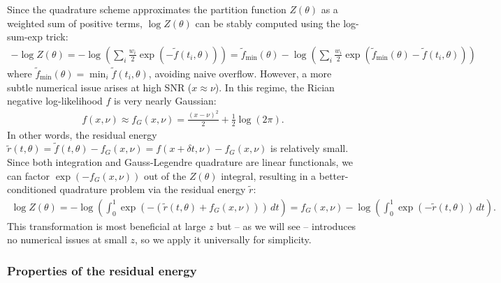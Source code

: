 \documentclass{article}
\begin{document}
Since the quadrature scheme approximates the partition function $Z(\theta)$ as a weighted sum of positive terms, $\log Z(\theta)$ can be stably computed using the log-sum-exp trick:
%
\begin{align}
  -\log Z(\theta)
  = -\log\left(\sum_i \frac{w_i}{2} \exp(-\tilde{f}(t_i, \theta))\right)
  = \tilde{f}_{\min}(\theta) - \log\left(\sum_i \frac{w_i}{2} \exp(\tilde{f}_{\min}(\theta) - \tilde{f}(t_i, \theta))\right)
\end{align}
%
where $\tilde{f}_{\min}(\theta) = \min_i \tilde{f}(t_i, \theta)$, avoiding naive overflow.
However, a more subtle numerical issue arises at high SNR ($x \approx \nu$).
In this regime, the Rician negative log-likelihood $f$ is very nearly Gaussian:
%
\begin{align}
  f(x, \nu) \approx f_G(x,\nu) = \frac{(x-\nu)^2}{2} + \frac{1}{2}\log(2\pi).
\end{align}
%
In other words, the residual energy $\tilde{r}(t,\theta) = \tilde{f}(t,\theta) - f_G(x,\nu) = f(x + \delta t, \nu) - f_G(x,\nu)$ is relatively small.
Since both integration and Gauss-Legendre quadrature are linear functionals, we can factor $\exp(-f_G(x,\nu))$ out of the $Z(\theta)$ integral, resulting in a better-conditioned quadrature problem via the residual energy $\tilde{r}$:
%
\begin{align}
  \log Z(\theta)
  = - \log\left(\int_0^1 \exp(-(\tilde{r}(t,\theta) + f_G(x,\nu))) \, dt \right)
  = f_G(x,\nu) - \log\left(\int_0^1 \exp(-\tilde{r}(t,\theta)) \, dt \right).
\end{align}
%
This transformation is most beneficial at large $z$ but -- as we will see -- introduces no numerical issues at small $z$, so we apply it universally for simplicity.

\subsubsection{Properties of the residual energy}
\end{document}
